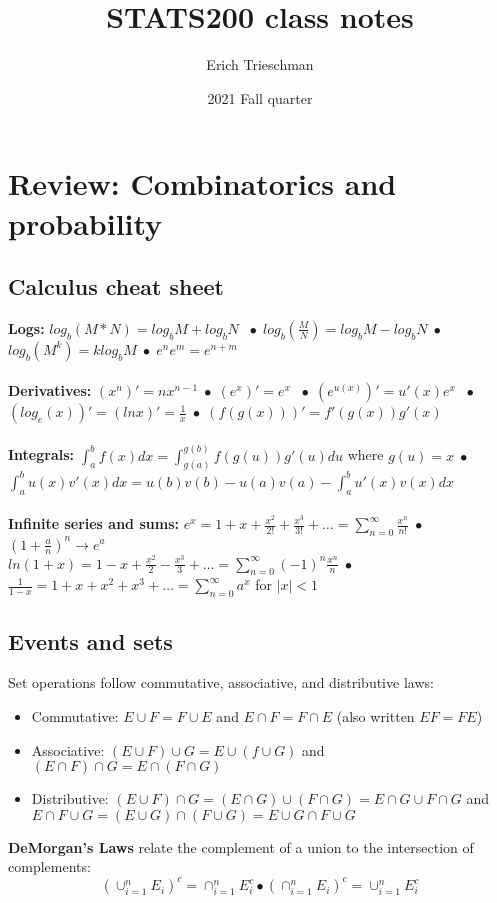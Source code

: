 \documentclass{article}
\title{STATS200 class notes}
\author{Erich Trieschman}
\date{2021 Fall quarter}
\newcommand{\abs}[1]{\lvert#1\rvert}
\newcommand{\bspace}{$\;\bullet\;$}
\begin{document}
\section{Review: Combinatorics and probability}
\subsection{Calculus cheat sheet}
\textbf{Logs:} $log_b(M * N) = log_bM + log_bN$ \bspace $log_b(\frac{M}{N}) = log_bM - log_bN$\bspace $log_b(M^k) = klog_bM$\bspace $e^ne^m = e^{n+m}$\\\\
\textbf{Derivatives:} $(x^n)' = nx^{n-1}$\bspace $(e^x)' = e^x$ \bspace $(e^{u(x)})' = u'(x)e^x$ \bspace $(log_e(x))' = (lnx)' = \frac{1}{x}$\bspace $(f(g(x)))' = f'(g(x))g'(x)$\\\\
\textbf{Integrals: } $\int_a^b f(x)dx = \int_{g(a)}^{g(b)}f(g(u))g'(u)du$ where $g(u) = x$\bspace $\int_a^b u(x)v'(x)dx = u(b)v(b) - u(a)v(a) - \int_a^b u'(x)v(x)dx$\\\\
\textbf{Infinite series and sums:} $e^x = 1 + x + \frac{x^2}{2!} + \frac{x^3}{3!} + \dots = \sum_{n=0}^\infty \frac{x^n}{n!}$\bspace $(1 + \frac{a}{n})^n \longrightarrow e^a$\\
$ln(1 + x) = 1 - x + \frac{x^2}{2} - \frac{x^3}{3} + \dots = \sum_{n=0}^\infty (-1)^n\frac{x^n}{n}$\bspace $\frac{1}{1-x} = 1 + x + x^2 + x^3 + \dots = \sum_{n=0}^\infty a^x$ for $\abs{x} < 1$

\subsection{Events and sets}
Set operations follow commutative, associative, and distributive laws:
\begin{itemize}
    \item Commutative: $E \cup F = F \cup E$ and $E\cap F = F \cap E $ (also written $EF = FE$)
    \item Associative: $(E\cup F)\cup G = E \cup (f\cup G)$ and $(E\cap F)\cap G = E\cap(F\cap G)$
    \item Distributive: $(E\cup F)\cap G = (E\cap G) \cup (F \cap G) = E\cap G \cup F \cap G$ and $E\cap F\cup G = (E\cup G) \cap (F \cup G) = E\cup G \cap F \cup G$
\end{itemize}
\textbf{DeMorgan's Laws} relate the complement of a union to the intersection of complements:
\begin{equation*}
    (\cup_{i=1}^n E_i)^c = \cap_{i=1}^nE_i^c \bullet (\cap_{i=1}^n E_i)^c = \cup_{i=1}^nE_i^c
\end{equation*}
\end{document}
